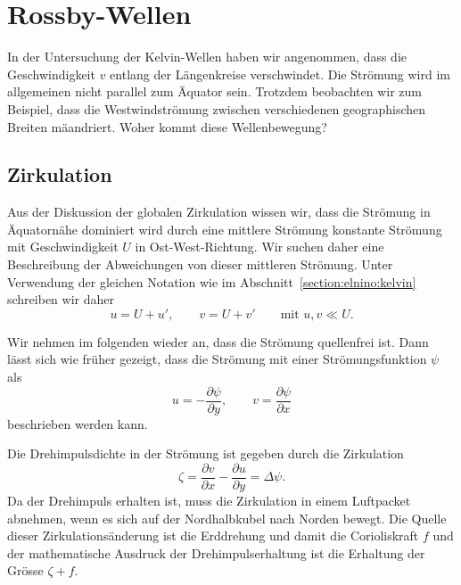 %
%
%

\section{Rossby-Wellen\label{section:elnino:rossby}}
In der Untersuchung der Kelvin-Wellen haben wir angenommen, dass die
Geschwindigkeit $v$ entlang der Längenkreise verschwindet.
Die Strömung wird im allgemeinen nicht parallel zum Äquator sein.
Trotzdem beobachten wir zum Beispiel, dass die Westwindströmung 
zwischen verschiedenen geographischen Breiten mäandriert.
Woher kommt diese Wellenbewegung?

\subsection{Zirkulation\label{subsection:rossby:zirkulation}}
Aus der Diskussion der globalen Zirkulation wissen wir, dass die
Strömung in Äquatornähe dominiert wird durch eine mittlere Strömung
konstante Strömung mit Geschwindigkeit $U$ in Ost-West-Richtung.
Wir suchen daher eine Beschreibung der Abweichungen von dieser
mittleren Strömung.
Unter Verwendung der gleichen Notation wie im
Abschnitt~\ref{section:elnino:kelvin} schreiben wir daher
\[
u=U+u',\qquad v=U+v'\qquad\text{mit $u,v\ll U$}.
\]


Wir nehmen im folgenden wieder an, dass die Strömung quellenfrei ist.
Dann lässt sich wie früher gezeigt, dass die Strömung mit einer
Strömungsfunktion $\psi$ als
\[
u=-\frac{\partial \psi}{\partial y},\qquad
v=\frac{\partial\psi}{\partial x}
\]
beschrieben werden kann.

Die Drehimpulsdichte in der Strömung ist gegeben durch die Zirkulation
\[
\zeta
=
\frac{\partial v}{\partial x} - \frac{\partial u}{\partial y}
=
\Delta \psi.
\]
Da der Drehimpuls erhalten ist, muss die Zirkulation in einem
Luftpacket abnehmen, wenn es sich auf der Nordhalbkubel nach Norden
bewegt.
Die Quelle dieser Zirkulationsänderung ist die Erddrehung und damit
die Corioliskraft $f$ und der mathematische Ausdruck der Drehimpulserhaltung
ist die Erhaltung der Grösse $\zeta+f$.

